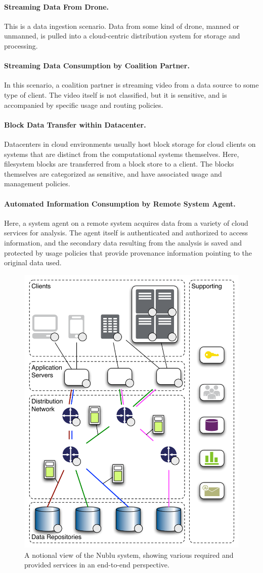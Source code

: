 \documentclass[10pt,letterpaper]{article}
\begin{document}
\paragraph{Streaming Data From Drone.} This is a data ingestion scenario.  Data from some kind of drone, manned or unmanned, is pulled into a cloud-centric distribution system for storage and processing.

\paragraph{Streaming Data Consumption by Coalition Partner.} In this scenario, a coalition partner is streaming video from a data source to some type of client. The video itself is not classified, but it is sensitive, and is accompanied by specific usage and routing policies.

\paragraph{Block Data Transfer within Datacenter.} Datacenters in cloud environments usually host block storage for cloud clients on systems that are distinct from the computational systems themselves.  Here, filesystem blocks are transferred from a block store to a client.  The blocks themselves are categorized as sensitive, and have associated usage and management policies.

\paragraph{Automated Information Consumption by Remote System Agent.} Here, a system agent on a remote system acquires data from a variety of cloud services for analysis.  The agent itself is authenticated and authorized to access information, and the secondary data resulting from the analysis is saved and protected by usage policies that provide provenance information pointing to the original data used.

\begin{figure}
\begin{center}
\includegraphics[width=.47\textwidth]{./images/network.pdf}
\end{center}
\caption{A notional view of the Nublu system, showing various required and provided services in an end-to-end perspective.}
\label{fig:network}
\end{figure}
\end{document}
